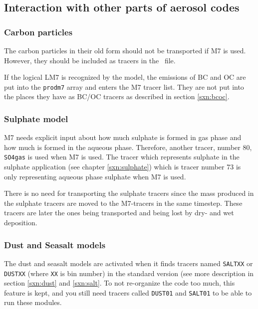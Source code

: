 \subsection{Interaction with other parts of aerosol codes}

\subsubsection{Carbon particles}
The carbon particles in their old form should not be transported if M7
is used. However, they should be included as tracers in the \inptrctm\
file.

If the logical LM7 is recognized by the model, the emissions of BC
and OC are put into the \verb#prodm7# array and enters the M7 tracer
list. They are not put into the places they have as BC/OC tracers as
described in section \ref{sxn:bcoc}.

\subsubsection{Sulphate model}
M7 needs explicit input about how much sulphate is formed in gas phase
and how much is formed in the aqueous phase. Therefore, another
tracer, number 80, \verb#SO4gas# is used when M7 is used.
The tracer which represents sulphate in the sulphate application (see
chapter \ref{sxn:sulphate}) which is tracer number 73 is only
representing aqueous phase sulphate when M7 is used.

There is no need for transporting the sulphate tracers since the mass
produced in the sulphate tracers are moved to the M7-tracers in the
same timestep. These tracers are later the ones being transported and
being lost by dry- and wet deposition.

\subsubsection{Dust and Seasalt models}

The dust and seasalt models are activated when it finds tracers
named \verb#SALTXX# or \verb#DUSTXX# (where \verb#XX# is bin number)
in the standard version (see more description in section
\ref{sxn:dust} and \ref{sxn:salt}. To not re-organize the code too
much, this feature is kept, and you still need tracers called
\verb#DUST01# and \verb#SALT01# to be able to run these modules.

